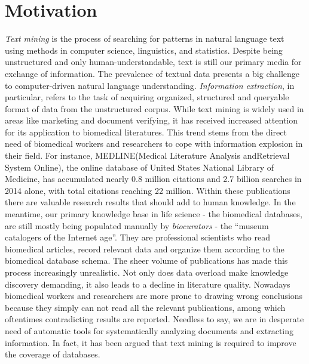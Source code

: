 \section{Motivation}\label{section1.1} %
\emph{Text mining} is the process of searching for patterns in natural language text using methods in computer science, linguistics, and statistics. Despite being unstructured and only human-understandable, text is still our primary media for exchange of information\cite{witten2005text}. The prevalence of textual data presents a big challenge to computer-driven natural language understanding. \emph{Information extraction}, in particular, refers to the task of acquiring organized, structured and queryable format of data from the unstructured corpus. \newline\newline
While text mining is widely used in areas like marketing and document verifying, it has received increased attention for its application to biomedical literatures\cite{kim2003genia,ananiadou2006text,krallinger2005text}. This trend stems from the direct need of biomedical workers and researchers to cope with information explosion in their field. For instance, MEDLINE(Medical Literature Analysis andRetrieval System Online), the online database of United States National Library of Medicine, has accumulated nearly 0.8 million citations and 2.7 billion searches in 2014 alone\cite{MEDLINE:2015:Online}, with total citations reaching 22 million. Within these publications there are valuable research results that should add to human knowledge. In the meantime,  our primary knowledge base in life science - the biomedical databases, are still mostly being populated manually by \emph{biocurators} - the ``museum catalogers of the Internet age''\cite{wiki:biocurators}. They are professional scientists who read biomedical articles, record relevant data and organize them according to the biomedical database schema. The sheer volume of publications has made this process increasingly unrealistic\cite{cohen2005survey}.\newline\newline
Not only does data overload make knowledge discovery demanding, it also leads to a decline in literature quality. Nowadays biomedical workers and researchers are more prone to drawing wrong conclusions because they simply can not read all the relevant publications, among which oftentimes contradicting results are reported. Needless to say, we are in desperate need of automatic tools for systematically analyzing documents and extracting information. In fact, it has been argued that text mining is required to improve the coverage of databases\cite{baumgartner2007manual}.


